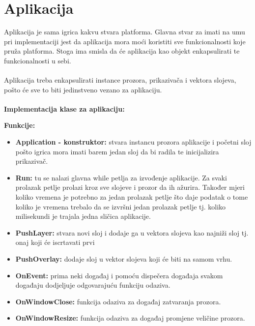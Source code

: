 \documentclass{mathos}
\begin{document}
\section{Aplikacija}
Aplikacija je sama igrica kakvu stvara platforma. Glavna stvar za imati na umu pri implementaciji jest da aplikacija mora moći koristiti sve funkcionalnosti koje pruža platforma.
Stoga ima smisla da će aplikacija kao objekt enkapsulirati te funkcionalnosti u sebi.
\\ \\
Aplikacija treba enkapsulirati instance prozora, prikazivača i vektora slojeva, pošto će sve to biti jedinstveno vezano za aplikaciju.
\\ \\
\textbf{Implementacija klase za aplikaciju:}

\textbf{Funkcije: }
\begin{itemize}
    \item \textbf{Application - konstruktor: }stvara instancu prozora aplikacije i početni sloj pošto igrica mora imati barem jedan sloj da bi radila te inicijalizira prikazivač.
    \item \textbf{Run: }tu se nalazi glavna while petlja za izvođenje aplikacije. Za svaki prolazak petlje prolazi kroz sve slojeve i prozor da ih ažurira. Također mjeri
          koliko vremena je potrebno za jedan prolazak petlje što daje podatak o tome koliko je vremena trebalo da se izvršni jedan prolazak petlje tj. koliko milisekundi je trajala
          jedna sličica aplikacije.
    \item \textbf{PushLayer: }stvara novi sloj i dodaje ga u vektora slojeva kao najniži sloj tj. onaj koji će iscrtavati prvi
    \item \textbf{PushOverlay: }dodaje sloj u vektor slojeva koji će biti na samom vrhu.
    \item \textbf{OnEvent:} prima neki događaj i pomoću dispečera događaja svakom događaju dodjeljuje odgovarajuću funkciju odaziva.
    \item \textbf{OnWindowClose:} funkcija odaziva za događaj zatvaranja prozora.
    \item \textbf{OnWindowResize:} funkcija odaziva za događaj promjene veličine prozora.
\end{itemize}
\end{document}
